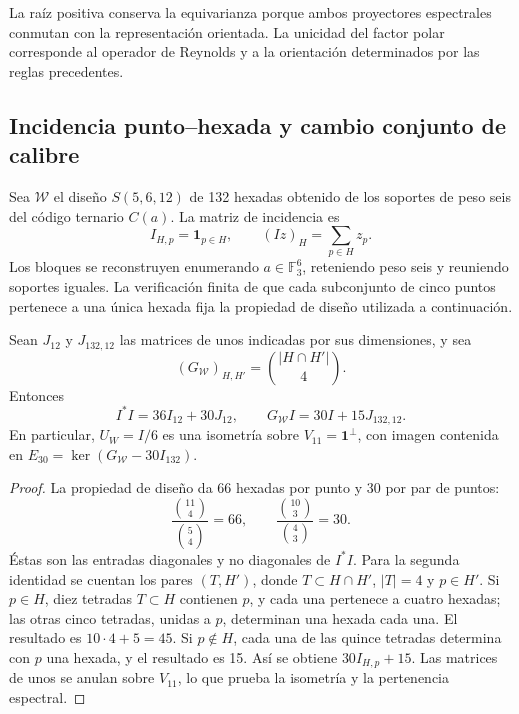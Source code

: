 La raíz positiva conserva la equivarianza porque ambos proyectores
espectrales conmutan con la representación orientada. La unicidad del
factor polar corresponde al operador de Reynolds y a la orientación
determinados por las reglas precedentes.

\subsection{Incidencia punto--hexada y cambio conjunto de calibre}

Sea \(\mathcal W\) el diseño \(S(5,6,12)\) de 132 hexadas obtenido
de los soportes de peso seis del código ternario \(C(a)\). La matriz
de incidencia es
\[
 I_{H,p}=\mathbf1_{p\in H},\qquad
 (Iz)_H=\sum_{p\in H}z_p.
\]
Los bloques se reconstruyen enumerando \(a\in\mathbb F_3^6\),
reteniendo peso seis y reuniendo soportes iguales. La verificación
finita de que cada subconjunto de cinco puntos pertenece a una única
hexada fija la propiedad de diseño utilizada a continuación.

\begin{lemma}
\label{lem:ii-witt-incidence-identities}
Sean \(J_{12}\) y \(J_{132,12}\) las matrices de unos indicadas por
sus dimensiones, y sea
\[
 (G_{\mathcal W})_{H,H'}=\binom{|H\cap H'|}{4}.
\]
Entonces
\begin{equation}
 I^*I=36I_{12}+30J_{12},\qquad
 G_{\mathcal W}I=30I+15J_{132,12}.
 \label{eq:ii-witt-incidence-identities}
\end{equation}
En particular, \(U_W=I/6\) es una isometría sobre
\(V_{11}=\mathbf1^\perp\), con imagen contenida en
\(E_{30}=\ker(G_{\mathcal W}-30I_{132})\).
\end{lemma}
\begin{proof}
La propiedad de diseño da 66 hexadas por punto y 30 por par de puntos:
\[
 \frac{\binom{11}{4}}{\binom54}=66,
 \qquad \frac{\binom{10}{3}}{\binom43}=30.
\]
Éstas son las entradas diagonales y no diagonales de \(I^*I\).
Para la segunda identidad se cuentan los pares \((T,H')\), donde
\(T\subset H\cap H'\), \(|T|=4\) y \(p\in H'\).
Si \(p\in H\), diez tetradas \(T\subset H\) contienen \(p\),
y cada una pertenece a cuatro hexadas; las otras cinco tetradas,
unidas a \(p\), determinan una hexada cada una. El resultado es
\(10\cdot4+5=45\). Si \(p\notin H\), cada una de las quince
tetradas determina con \(p\) una hexada, y el resultado es 15.
Así se obtiene \(30I_{H,p}+15\). Las matrices de unos se anulan sobre
\(V_{11}\), lo que prueba la isometría y la pertenencia espectral.
\end{proof}


